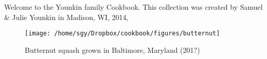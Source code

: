 Welcome to the Younkin family Cookbook.  This collection was created
by Samuel \& Julie Younkin in Madison, WI, 2014,

\begin{figure}[b]
\begin{center}
\texttt{[image: /home/sgy/Dropbox/cookbook/figures/butternut]}
\end{center}
\caption*{Butternut squash grown in Baltimore, Maryland (201?)}
\end{figure}



